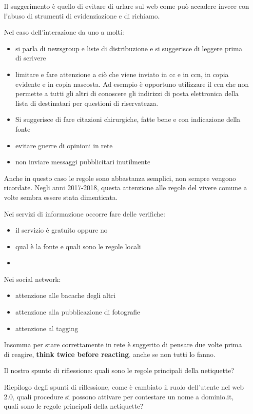 Il suggerimento è quello di evitare di urlare sul web come può accadere invece con l'abuso di strumenti di evidenziazione e di richiamo.\par
Nel caso dell'interazione da uno a molti:
\begin{itemize}
    \item si parla di newsgroup e liste di distribuzione e si suggerisce di leggere prima di scrivere
    \item limitare e fare attenzione a ciò che viene inviato in cc e in ccn, in copia evidente e in copia nascosta. Ad esempio è opportuno utilizzare il ccn che non permette a tutti gli altri di conoscere gli indirizzi di posta elettronica della lista di destinatari per questioni di riservatezza.
    \item Si suggerisce di fare citazioni chirurgiche, fatte bene e con indicazione della fonte
    \item evitare guerre di opinioni in rete
    \item non inviare messaggi pubblicitari inutilmente
\end{itemize}

Anche in questo caso le regole sono abbastanza semplici, non sempre vengono ricordate. Negli anni 2017-2018, questa attenzione alle regole del vivere comune a volte sembra essere stata dimenticata. \par

Nei servizi di informazione occorre fare delle verifiche:

\begin{itemize}
    \item il servizio è gratuito oppure no
    \item qual è la fonte e quali sono le regole locali
    \item
\end{itemize}
\par
Nei social network:

\begin{itemize}
    \item attenzione alle bacache degli altri
    \item attenzione alla pubblicazione di fotografie
    \item attenzione al tagging
\end{itemize}

Insomma per stare correttamente in rete è suggerito di pensare due volte prima di reagire, \textbf{think twice before reacting}, anche se non tutti lo fanno. \par
Il nostro spunto di riflessione: quali sono le regole principali della netiquette?\par
Riepilogo degli spunti di riflessione, come è cambiato il ruolo dell'utente nel web 2.0, quali procedure si possono attivare per contestare un nome a dominio.it, quali sono le regole principali della netiquette?